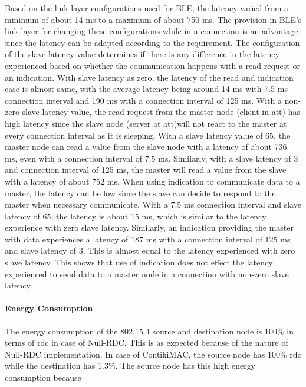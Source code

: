Based on the link layer configurations used for BLE, the latency varied from a minimum of about 14 ms to a maximum of about 750 ms. The provision in BLE's link layer for changing these configurations while in a connection is an advantage since the latency can be adapted according to the requirement. The configuration of the slave latency value determines if there is any difference in the latency experienced based on whether the communication happens with a read request or an indication. With slave latency as zero, the latency of the read and indication case is almost same, with the average latency being around 14 ms with 7.5 ms connection interval and 190 ms with a connection interval of 125 ms. With a non-zero slave latency value, the read-request from the master node (client in \gls{att}) has high latency since the slave node (server at \gls{att})will not react to the master at every connection interval as it is sleeping. With a slave latency value of 65, the master node can read a value from the slave node with a latency of about 736 ms, even with a connection interval of 7.5 ms. Similarly, with a slave latency of 3 and connection interval of 125 ms, the master will read a value from the slave with a latency of about 752 ms. When using indication to communicate data to a master, the latency can be low since the slave can decide to respond to the master when necessary communicate. With a 7.5 ms connection interval and slave latency of 65, the latency is about 15 ms, which is similar to the latency experience with zero slave latency. Similarly, an indication providing the master with data experiences a latency of 187 ms with a connection interval of 125 ms and slave latency of 3. This is almost equal to the latency experienced with zero slave latency. This shows that use of indication does not effect the latency experienced to send data to a master node in a connection with non-zero slave latency.

\paragraph{Energy Consumption}
The energy consumption of the 802.15.4 source and destination node is 100\% in terms of \gls{rdc} in case of Null-RDC. This is as expected because of the nature of Null-RDC implementation. In case of ContikiMAC, the source node has 100\% \gls{rdc} while the destination has 1.3\%. The source node has this high energy consumption because  

